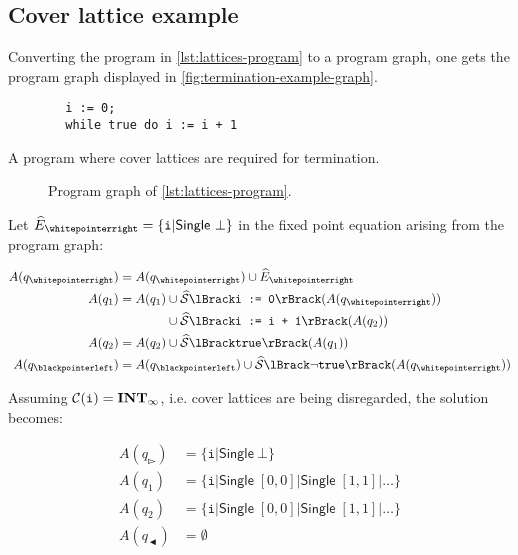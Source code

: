 \subsection{Cover lattice example}

Converting the program in \autoref{lst:lattices-program} to a program graph, one gets the program graph displayed in \autoref{fig:termination-example-graph}.

\begin{listing}
    \begin{verbatim}
        i := 0;
        while true do i := i + 1
    \end{verbatim}
    \caption{A program where cover lattices are required for termination.}
    \label{lst:lattices-program}
\end{listing}

\begin{figure}
    \centering
    
    \caption{Program graph of \autoref{lst:lattices-program}.}
    \label{fig:termination-example-graph}
\end{figure}

Let $\ab{E}_\whitepointerright = \{ \texttt{i} | \mathsf{Single}\ \bot \}$ in the fixed point equation arising from the program graph:

\begin{align}
    A(q_\whitepointerright) &= A(q_\whitepointerright) \cup \ab{E}_\whitepointerright \\
    A(q_1) &= \begin{aligned}[t]
        A(q_1) &\cup \abssem{\texttt{i := 0}}(A(q_\whitepointerright)) \\
        &\cup \abssem{\texttt{i := i + 1}}(A(q_2))
    \end{aligned} \\
    A(q_2) &= A(q_2) \cup \abssem{\texttt{true}} (A(q_1)) \\
    A(q_\blackpointerleft) &= A(q_\blackpointerleft) \cup \abssem{\neg\texttt{true}}(A(q_\whitepointerright))
\end{align}

Assuming $\mathcal{C}(\texttt{i}) = \mathbf{INT}_{\infty}$, i.e. cover lattices are being disregarded, the solution becomes:

\begin{align}
    A(q_\whitepointerright) &= \{ \texttt{i} |\mathsf{Single}\ \bot \} \\
    A(q_1) &= \{ \texttt{i} | \mathsf{Single} \; [0, 0] | \mathsf{Single} \; [1, 1] | \dots \} \\
    A(q_2) &= \{ \texttt{i} | \mathsf{Single} \; [0, 0] | \mathsf{Single} \; [1, 1] | \dots \} \\
    A(q_\blackpointerleft) &= \emptyset
\end{align}

